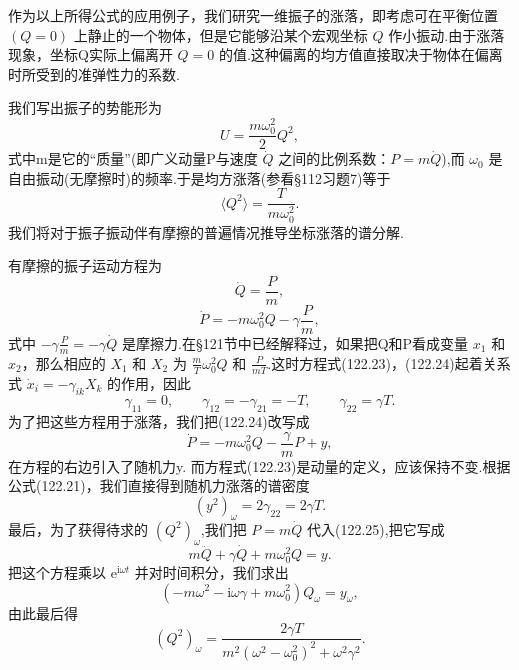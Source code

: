 作为以上所得公式的应用例子，我们研究一维振子的涨落，即考虑可在平衡位置 $(Q=0)$ 上静止的一个物体，但是它能够沿某个宏观坐标 $Q$ 作小振动.由于涨落现象，坐标Q实际上偏离开 $Q=0$ 的值.这种偏离的均方值直接取决于物体在偏离时所受到的准弹性力的系数.

我们写出振子的势能形为
\begin{equation*}
  U=\frac{m\omega_0^2}{2}Q^2,
\end{equation*}
式中m是它的“质量”(即广义动量P与速度 $\dot{Q}$ 之间的比例系数：$P=m\dot{Q}$),而 $\omega_0$ 是自由振动(无摩擦时)的频率.于是均方涨落(参看§112习题7)等于
\begin{equation}
  \langle Q^2\rangle=\frac{T}{m\omega_0^2}.
\end{equation}
我们将对于振子振动伴有摩擦的普遍情况推导坐标涨落的谱分解.

有摩擦的振子运动方程为
\begin{equation}
  \dot{Q}=\frac{P}{m},
\end{equation}
\begin{equation}
  \dot{P}=-m\omega_0^2Q-\gamma\frac{P}{m},
\end{equation}
式中 $-\gamma\frac{P}{m}=-\gamma\dot{Q}$ 是摩擦力.在§121节中已经解释过，如果把Q和P看成变量 $x_1$ 和 $x_2$，那么相应的 $X_1$ 和 $X_2$ 为 $\frac{m}{T}\omega_0^2Q$ 和 $\frac{P}{mT}$.这时方程式(122.23)，(122.24)起着关系式 $\dot{x}_i=-\gamma_{ik}X_k$ 的作用，因此
\begin{equation*}
  \gamma_{11}=0,\qquad\gamma_{12}=-\gamma_{21}=-T,\qquad
  \gamma_{22}=\gamma T.
\end{equation*}
为了把这些方程用于涨落，我们把(122.24)改写成
\begin{equation}
  \dot{P}=-m\omega_0^2Q-\frac{\gamma}{m}P+y,
\end{equation}
在方程的右边引入了随机力y. 而方程式(122.23)是动量的定义，应该保持不变.根据公式(122.21)，我们直接得到随机力涨落的谱密度
\begin{equation}
  (y^2)_\omega=2\gamma_{22}=2\gamma T.
\end{equation}
最后，为了获得待求的 $(Q^2)_\omega$,我们把 $P=m\dot{Q}$ 代入(122.25),把它写成
\begin{equation}
  m\ddot{Q}+\gamma\dot{Q}+m\omega_0^2Q=y.
\end{equation}
把这个方程乘以 $\mathrm{e}^{\mathrm{i}\omega t}$ 并对时间积分，我们求出
\begin{equation*}
  \left(-m\omega^2-\mathrm{i}\omega\gamma+m\omega_0^2\right)Q_\omega=y_\omega,
\end{equation*}
由此最后得
\begin{equation}
  (Q^2)_\omega=\frac{2\gamma T}{m^2(\omega^2-\omega_0^2)^2+\omega^2\gamma^2}.
\end{equation}

